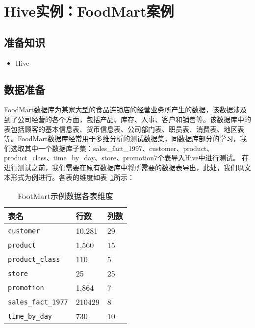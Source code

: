 \section{Hive实例：FoodMart案例}\label{ux5b9eux4f8bux5206ux6790foodmartux6570ux636eux96c6ux5728hiveux5e73ux53f0ux7684ux4f7fux7528ux6848ux4f8b}

\subsection{准备知识}\label{ux51c6ux5907ux77e5ux8bc6}

\begin{itemize}
\itemsep1pt\parskip0pt
\item
  Hive
\end{itemize}

\subsection{数据准备}\label{ux6570ux636eux51c6ux5907}

FoodMart数据库为某家大型的食品连锁店的经营业务所产生的数据，该数据涉及到了公司经营的各个方面，包括产品、库存、人事、客户和销售等。该数据库中的表包括顾客的基本信息表、货币信息表、公司部门表、职员表、消费表、地区表等。FoodMart数据库经常用于多维分析的测试数据集，同数据库部分的学习，我们选取其中一个数据库子集：sales\_fact\_1997、customer、product、product\_class、time\_by\_day、store、promotion7个表导入Hive中进行测试。
在进行测试之前，我们需要在原有数据库中将所需要的数据表导出，此处，我们以文本形式为例进行。各表的维度如表~\ref{tab:Footmart-dimension}所示：


\begin{table}[!hbp]
	\centering
	\caption{FootMart示例数据各表维度}
	\label{tab:Footmart-dimension}
	\begin{tabular}{lll}
\toprule
	表名  &行数&列数\\
\midrule
\texttt{customer} &10,281 &29\\
\texttt{product} &1,560 &15\\
\texttt{product\_class} &110 &5\\
\texttt{store} &25 &25\\
\texttt{promotion} &1,864 &7\\
\texttt{sales\_fact\_1977} &210429 &8\\
\texttt{time\_by\_day} &730 &10\\
\bottomrule
	\end{tabular}

\end{table}

